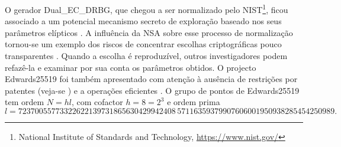 O gerador Dual\_EC\_DRBG, que chegou a ser
normalizado pelo NIST\footnote{\label{NIST_note}National Institute of Standards
and Technology, \url{https://www.nist.gov/}}, ficou associado a um potencial
mecanismo secreto de exploração baseado nos seus parâmetros elípticos
\cite{hales2014nsa}. A
influência da NSA sobre esse processo de normalização tornou-se um exemplo dos
riscos de concentrar escolhas criptográficas pouco transparentes
\cite{NSA-NIST}. Quando a escolha é reproduzível, outros investigadores
podem refazê-la e examinar por sua conta os parâmetros obtidos.
%
O projecto Edwards25519 foi também apresentado com atenção à ausência de
restrições por patentes (veja-se \cite{ECC-patents}) e a operações eficientes
 \cite{Bernstein2007}.
%
O grupo de pontos de Edwards25519 tem ordem \(N=hl\), com cofactor
\(h=8=2^3\) e ordem prima
\[
l=72370055773322622139731865630429942408\,
57116359379907606001950938285454250989.
\]

